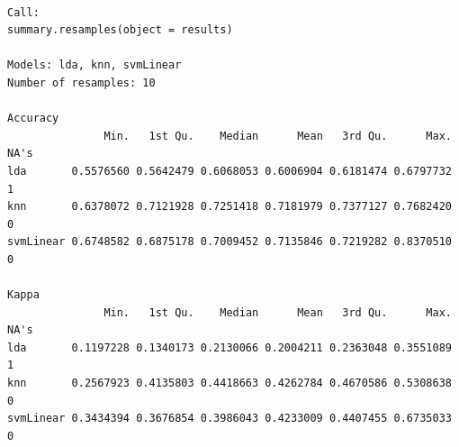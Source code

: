 \begin{Shaded}
\begin{Highlighting}[]
\OtherTok{\textless{}{-}} \NormalTok{(}\NormalTok{, } \NormalTok{, }\NormalTok{, }\SpecialCharTok{$} \NormalTok{), } \NormalTok{)}

\OtherTok{\textless{}{-}} \NormalTok{(}\NormalTok{, }\NormalTok{, }\NormalTok{)}


\OtherTok{\textless{}{-}} \SpecialCharTok{\textasciitilde{}} \NormalTok{)}

\OtherTok{\textless{}{-}} 

\end{Highlighting}
\end{Shaded}

\begin{verbatim}

Call:
summary.resamples(object = results)

Models: lda, knn, svmLinear 
Number of resamples: 10 

Accuracy 
               Min.   1st Qu.    Median      Mean   3rd Qu.      Max. NA's
lda       0.5576560 0.5642479 0.6068053 0.6006904 0.6181474 0.6797732    1
knn       0.6378072 0.7121928 0.7251418 0.7181979 0.7377127 0.7682420    0
svmLinear 0.6748582 0.6875178 0.7009452 0.7135846 0.7219282 0.8370510    0

Kappa 
               Min.   1st Qu.    Median      Mean   3rd Qu.      Max. NA's
lda       0.1197228 0.1340173 0.2130066 0.2004211 0.2363048 0.3551089    1
knn       0.2567923 0.4135803 0.4418663 0.4262784 0.4670586 0.5308638    0
svmLinear 0.3434394 0.3676854 0.3986043 0.4233009 0.4407455 0.6735033    0
\end{verbatim}

